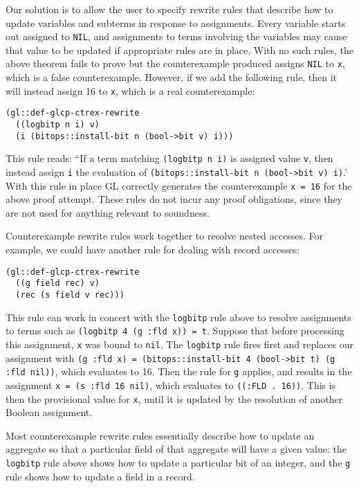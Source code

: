 \documentclass[submission,copyright,creativecommons]{eptcs}
\begin{document}
Our solution is to allow the user to specify rewrite rules that
describe how to update variables and subterms in response to
assignments.  Every variable starts out assigned to \texttt{NIL}, and
assignments to terms involving the variables may cause that value to
be updated if appropriate rules are in place.  With no such rules, the
above theorem fails to prove but the counterexample produced assigns
\texttt{NIL} to \texttt{x}, which is a false counterexample.  However,
if we add the following rule, then it will instead assign 16 to
\texttt{x}, which is a real counterexample:
\begin{verbatim}
(gl::def-glcp-ctrex-rewrite
  ((logbitp n i) v)
  (i (bitops::install-bit n (bool->bit v) i)))
\end{verbatim}
This rule reads: ``If a term matching \texttt{(logbitp n i)} is
assigned value \texttt{v}, then instead assign \texttt{i} the
evaluation of \texttt{(bitops::install-bit n (bool->bit v) i)}.'  With
this rule in place GL correctly generates the counterexample \texttt{x
  = 16} for the above proof attempt.  These rules do not incur any
proof obligations, since they are not used for anything relevant to
soundness.

Counterexample rewrite rules work together to resolve nested accesses.
For example, we could have another rule for dealing with record accesses:
\begin{verbatim}
(gl::def-glcp-ctrex-rewrite
  ((g field rec) v)
  (rec (s field v rec)))
\end{verbatim}
\noindent This rule can work in concert with the \texttt{logbitp} rule
above to resolve assignments to terms such as \texttt{(logbitp 4 (g
  :fld x)) = t}.  Suppose that before processing this assignment, \texttt{x} was bound to \texttt{nil}.
The \texttt{logbitp} rule fires
first and replaces our assignment with \texttt{(g :fld x) =
  (bitops::install-bit 4 (bool->bit t) (g :fld nil))}, which evaluates
to 16.  Then the rule for \texttt{g} applies, and results in the
assignment \texttt{x = (s :fld 16 nil)}, which evaluates to
\texttt{((:FLD . 16))}.  This is then the provisional value for
\texttt{x}, until it is updated by the resolution of another Boolean assignment.

Most counterexample rewrite rules essentially describe how to update
an aggregate so that a particular field of that aggregate will have a
given value: the \texttt{logbitp} rule above shows how to update a
particular bit of an integer, and the \texttt{g} rule shows how to
update a field in a record.  
\end{document}
